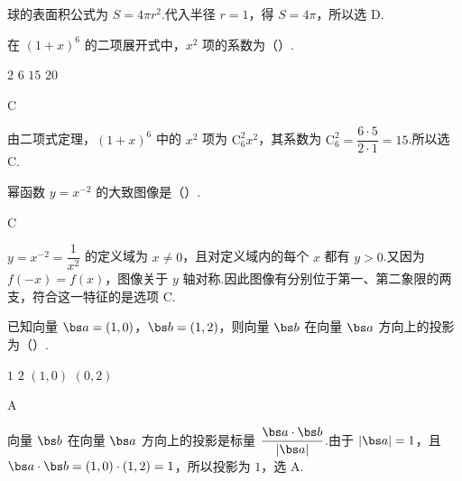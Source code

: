 \begin{solution}
球的表面积公式为 \(S=4\pi r^2\).代入半径 \(r=1\)，得 \(S=4\pi\)，所以选 D.
\end{solution}

\begin{problem}
在 \((1+x)^6\) 的二项展开式中，\(x^2\) 项的系数为（\quad）.

\choices
    {\(2\)}
    {\(6\)}
    {\(15\)}
    {\(20\)}
\end{problem}

\begin{answer}
C
\end{answer}

\begin{solution}
由二项式定理，\((1+x)^6\) 中的 \(x^2\) 项为 \(\mathrm C_6^2x^2\)，其系数为
\(\mathrm C_6^2=\dfrac{6\cdot5}{2\cdot1}=15\).所以选 C.
\end{solution}

\begin{problem}
幂函数 \(y=x^{-2}\) 的大致图像是（\quad）.

    {}
    {}
    {}
\end{problem}

\begin{answer}
C
\end{answer}

\begin{solution}
\(y=x^{-2}=\dfrac1{x^2}\) 的定义域为 \(x\neq0\)，且对定义域内的每个 \(x\) 都有 \(y>0\).又因为 \(f(-x)=f(x)\)，图像关于 \(y\) 轴对称.因此图像有分别位于第一、第二象限的两支，符合这一特征的是选项 C.
\end{solution}

\begin{problem}
已知向量 \(\bs a=(1,0)\)，\(\bs b=(1,2)\)，则向量 \(\bs b\) 在向量 \(\bs a\) 方向上的投影为（\quad）.

\choices
    {\(1\)}
    {\(2\)}
    {\((1,0)\)}
    {\((0,2)\)}
\end{problem}

\begin{answer}
A
\end{answer}

\begin{solution}
向量 \(\bs b\) 在向量 \(\bs a\) 方向上的投影是标量 \(\dfrac{\bs a\cdot\bs b}{|\bs a|}\).由于 \(|\bs a|=1\)，且
\(\bs a\cdot\bs b=(1,0)\cdot(1,2)=1\)，所以投影为 \(1\)，选 A.
\end{solution}

